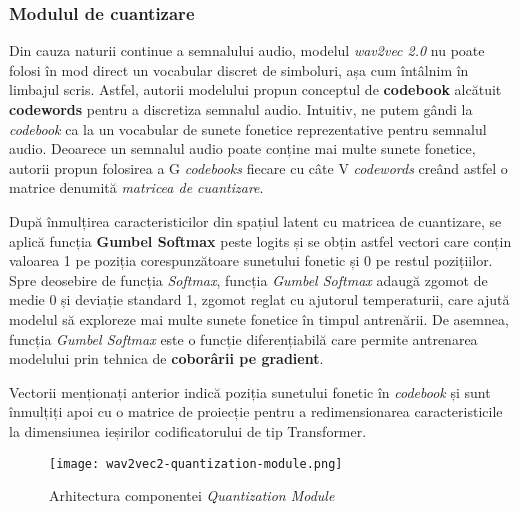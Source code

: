 \subsubsection{Modulul de cuantizare}
\vspace{1em}
Din cauza naturii continue a semnalului audio, modelul \textit{wav2vec 2.0} nu poate folosi în mod direct
un vocabular discret de simboluri, așa cum întâlnim în limbajul scris. Astfel, autorii modelului propun
conceptul de \textbf{codebook} alcătuit \textbf{codewords} pentru a discretiza semnalul audio. Intuitiv,
ne putem gândi la \textit{codebook} ca la un vocabular de sunete fonetice reprezentative pentru semnalul
audio. Deoarece un semnalul audio poate conține mai multe sunete fonetice, autorii propun folosirea
a G \textit{codebooks} fiecare cu câte V \textit{codewords} creând astfel o matrice denumită \textit{matricea
de cuantizare}.
\par
După înmulțirea caracteristicilor din spațiul latent cu matricea de cuantizare, se aplică funcția
\textbf{Gumbel Softmax} peste logits și se obțin astfel vectori care conțin valoarea 1 pe poziția
corespunzătoare sunetului fonetic și 0 pe restul pozițiilor. Spre deosebire de funcția \textit{Softmax},
funcția \textit{Gumbel Softmax} adaugă zgomot de medie 0 și deviație standard 1, zgomot reglat cu 
ajutorul temperaturii, care ajută modelul să exploreze mai multe sunete fonetice în timpul antrenării.
De asemnea, funcția \textit{Gumbel Softmax} este o funcție diferențiabilă care permite antrenarea modelului
prin tehnica de \textbf{coborârii pe gradient}.
\par
Vectorii menționați anterior indică poziția sunetului fonetic în \textit{codebook} și sunt înmulțiți
apoi cu o matrice de proiecție pentru a redimensionarea caracteristicile la dimensiunea ieșirilor
codificatorului de tip Transformer.

\vspace{1.5em}
\begin{figure}[h]
    \centering
    \texttt{[image: wav2vec2-quantization-module.png]}
    \caption{Arhitectura componentei \textit{Quantization Module} \protect\footnotemark[1]}
    \label{fig:wav2vec2-quantization-module}
\end{figure}
\vspace{1em}

